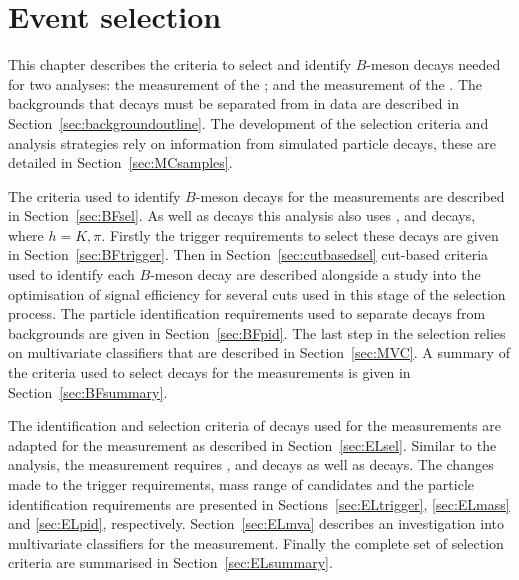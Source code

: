 \chapter{{\bf Event selection}}
\label{selection_chapter}

This chapter describes the criteria to select and identify $B$-meson decays needed for two analyses: the measurement of the \bmumu \BFs; and the measurement of the \bsmumu \el. The backgrounds that \bmumu decays must be separated from in data are described in Section~\ref{sec:backgroundoutline}. The development of the selection criteria and analysis strategies rely on information from simulated particle decays, these are detailed in Section~\ref{sec:MCsamples}. 

The criteria used to identify $B$-meson decays for the \BF measurements are described in Section~\ref{sec:BFsel}. As well as \bmumu decays this analysis also uses \bukpsik, \bsjpsiphi and \bhh decays, where $h = K, \pi$. Firstly the trigger requirements to select these decays are given in Section~\ref{sec:BFtrigger}. Then in Section~\ref{sec:cutbasedsel} cut-based criteria used to identify each $B$-meson decay are described alongside a study into the optimisation of signal efficiency for several cuts used in this stage of the selection process. The particle identification requirements used to separate \bmumu decays from backgrounds are given in Section~\ref{sec:BFpid}. The last step in the selection relies on multivariate classifiers that are described in Section~\ref{sec:MVC}. A summary of the criteria used to select \bmumu decays for the \BF measurements is given in Section~\ref{sec:BFsummary}.

The identification and selection criteria of decays used for the \BF measurements are adapted for the \el measurement as described in Section~\ref{sec:ELsel}. Similar to the \BF analysis, the \el measurement requires \bsjpsiphi, \bdkpi and \bskk decays as well as \bsmumu decays. The changes made to the trigger requirements, mass range of \bsmumu candidates and the particle identification requirements are presented in Sections~\ref{sec:ELtrigger}, \ref{sec:ELmass} and \ref{sec:ELpid}, respectively. Section~\ref{sec:ELmva} describes an investigation into multivariate classifiers for the \el measurement. Finally the complete set of selection criteria are summarised in Section~\ref{sec:ELsummary}. 




